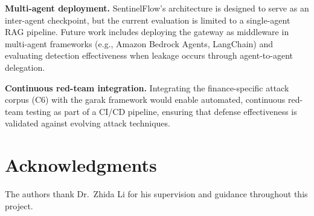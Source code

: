 \documentclass[journal,12pt,onecolumn,draftclsnofoot]{IEEEtran}
\begin{document}
\textbf{Multi-agent deployment.} SentinelFlow's architecture is designed to serve as an inter-agent checkpoint, but the current evaluation is limited to a single-agent RAG pipeline. Future work includes deploying the gateway as middleware in multi-agent frameworks (e.g., Amazon Bedrock Agents, LangChain) and evaluating detection effectiveness when leakage occurs through agent-to-agent delegation.

\textbf{Continuous red-team integration.} Integrating the finance-specific attack corpus (C6) with the garak framework would enable automated, continuous red-team testing as part of a CI/CD pipeline, ensuring that defense effectiveness is validated against evolving attack techniques.


\section*{Acknowledgments}
The authors thank Dr.\ Zhida Li for his supervision and guidance throughout this project.
\end{document}
